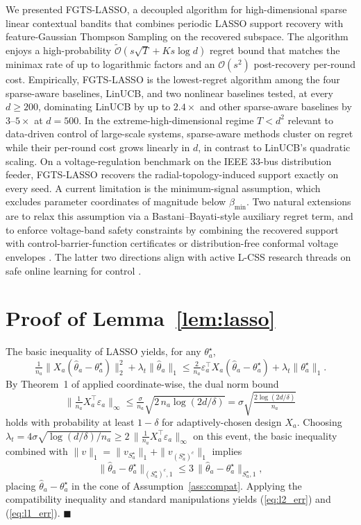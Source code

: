 \documentclass[journal,twoside,web]{ieeecolor}
\begin{document}
We presented FGTS-LASSO, a decoupled algorithm for high-dimensional sparse linear contextual bandits that combines periodic LASSO support recovery with feature-Gaussian Thompson Sampling on the recovered subspace. The algorithm enjoys a high-probability $\tilde{\mathcal{O}}(s\sqrt{T} + Ks\log d)$ regret bound that matches the minimax rate of \cite{hao2020high} up to logarithmic factors and an $\mathcal{O}(s^2)$ post-recovery per-round cost. Empirically, FGTS-LASSO is the lowest-regret algorithm among the four sparse-aware baselines, LinUCB, and two nonlinear baselines tested, at every $d \geq 200$, dominating LinUCB by up to $2.4\times$ and other sparse-aware baselines by $3$--$5\times$ at $d = 500$. In the extreme-high-dimensional regime $T < d^2$ relevant to data-driven control of large-scale systems, sparse-aware methods cluster on regret while their per-round cost grows linearly in $d$, in contrast to LinUCB's quadratic scaling. On a voltage-regulation benchmark on the IEEE 33-bus distribution feeder, FGTS-LASSO recovers the radial-topology-induced support exactly on every seed. A current limitation is the minimum-signal assumption, which excludes parameter coordinates of magnitude below $\beta_{\min}$. Two natural extensions are to relax this assumption via a Bastani--Bayati-style auxiliary regret term, and to enforce voltage-band safety constraints by combining the recovered support with control-barrier-function certificates \cite{ames2017cbf} or distribution-free conformal voltage envelopes \cite{vovk2005algorithmic}. The latter two directions align with active L-CSS research threads on safe online learning for control \cite{capone2024learning}.

\appendices

\section{Proof of Lemma~\ref{lem:lasso}}\label{app:lasso}

The basic inequality of LASSO yields, for any $\theta^\star_a$,
\[
\tfrac{1}{n_a}\|X_a(\hat\theta_a - \theta^\star_a)\|_2^2 + \lambda_t \|\hat\theta_a\|_1 \leq \tfrac{2}{n_a}\varepsilon_a^\top X_a (\hat\theta_a - \theta^\star_a) + \lambda_t \|\theta^\star_a\|_1.
\]
By Theorem~1 of \cite{abbasi2011improved} applied coordinate-wise, the dual norm bound
\[
\Big\|\tfrac{1}{n_a} X_a^\top \varepsilon_a\Big\|_\infty \leq \tfrac{\sigma}{n_a}\sqrt{2\, n_a \log(2d/\delta)} = \sigma\sqrt{\tfrac{2\log(2d/\delta)}{n_a}}
\]
holds with probability at least $1 - \delta$ for adaptively-chosen design $X_a$. Choosing $\lambda_t = 4\sigma\sqrt{\log(d/\delta)/n_a} \geq 2\,\|\tfrac{1}{n_a} X_a^\top \varepsilon_a\|_\infty$ on this event, the basic inequality combined with $\|v\|_1 = \|v_{S^\star_a}\|_1 + \|v_{(S^\star_a)^c}\|_1$ implies
\[
\|\hat\theta_a - \theta^\star_a\|_{(S^\star_a)^c, 1} \leq 3\,\|\hat\theta_a - \theta^\star_a\|_{S^\star_a, 1},
\]
placing $\hat\theta_a - \theta^\star_a$ in the cone of Assumption~\ref{ass:compat}. Applying the compatibility inequality and standard manipulations \cite[Sec.~6.2]{vandegeer2009conditions} yields (\ref{eq:l2_err}) and (\ref{eq:l1_err}). \hfill$\blacksquare$
\end{document}
